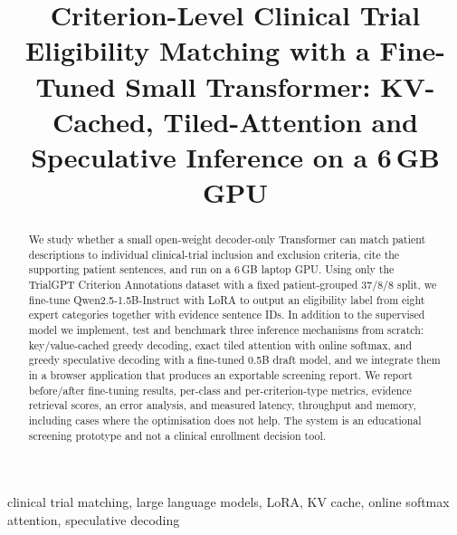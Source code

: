 \documentclass[conference]{IEEEtran}
\begin{document}
\title{Criterion-Level Clinical Trial Eligibility Matching with a Fine-Tuned Small Transformer: KV-Cached, Tiled-Attention and Speculative Inference on a 6\,GB GPU}

\author{
}

\maketitle

\begin{abstract}
We study whether a small open-weight decoder-only Transformer can match patient descriptions to individual clinical-trial inclusion and exclusion criteria, cite the supporting patient sentences, and run on a 6\,GB laptop GPU. Using only the TrialGPT Criterion Annotations dataset with a fixed patient-grouped 37/8/8 split, we fine-tune Qwen2.5-1.5B-Instruct with LoRA to output an eligibility label from eight expert categories together with evidence sentence IDs. In addition to the supervised model we implement, test and benchmark three inference mechanisms from scratch: key/value-cached greedy decoding, exact tiled attention with online softmax, and greedy speculative decoding with a fine-tuned 0.5B draft model, and we integrate them in a browser application that produces an exportable screening report. We report before/after fine-tuning results, per-class and per-criterion-type metrics, evidence retrieval scores, an error analysis, and measured latency, throughput and memory, including cases where the optimisation does not help. The system is an educational screening prototype and not a clinical enrollment decision tool.
\end{abstract}

\begin{IEEEkeywords}
clinical trial matching, large language models, LoRA, KV cache, online softmax attention, speculative decoding
\end{IEEEkeywords}






\end{document}
